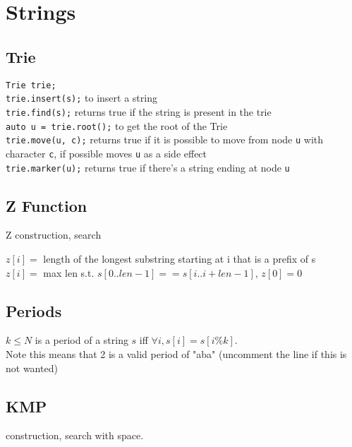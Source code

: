 \section{Strings}


\subsection{Trie}
\verb|Trie trie;| \\
\verb|trie.insert(s);|
to insert a string \\
\verb|trie.find(s);|
returns true if the string is present in the trie \\
\verb|auto u = trie.root();|
to get the root of the Trie \\
\verb|trie.move(u, c);|
returns true if it is possible to move from node \verb|u| with character \verb|c|,
if possible moves \verb|u| as a side effect \\
\verb|trie.marker(u);|
returns true if there's a string ending at node \verb|u| \\


\subsection{Z Function}
 Z construction,  search

\begin{flushleft}
$z[i] = $ length of the longest substring starting at i that is a prefix of s \\
$z[i] = $ max len s.t. $s[0..len-1] == s[i..i+len-1]$, $z[0] = 0$
\end{flushleft}

\subsection{Periods}

$k \leq N$ is a period of a string $s$ iff $\forall i, s[i] = s[i\%k]$. \\
Note this means that 2 is a valid period of "aba" 
(uncomment the line if this is not wanted)

\subsection{KMP}
 construction,  search with  space.


